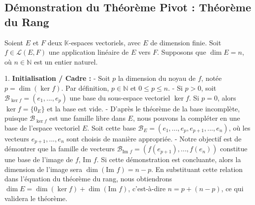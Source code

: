 \documentclass{report}
\begin{document}
\subsection*{Démonstration du Théorème Pivot : Théorème du Rang}
Soient $E$ et $F$ deux $\mathbb{K}$-espaces vectoriels, avec $E$ de dimension finie. Soit $f \in \mathcal{L}(E, F)$ une application linéaire de $E$ vers $F$. Supposons que $\dim E = n$, où $n \in \mathbb{N}$ est un entier naturel.

1.  \textbf{Initialisation / Cadre :}
    -   Soit $p$ la dimension du noyau de $f$, notée $p = \dim(\ker f)$. Par définition, $p \in \mathbb{N}$ et $0 \le p \le n$.
    -   Si $p > 0$, soit $\mathcal{B}_{\ker f} = (e_1, ..., e_p)$ une base du sous-espace vectoriel $\ker f$. Si $p=0$, alors $\ker f = \{0_E\}$ et la base est vide.
    -   D'après le théorème de la base incomplète, puisque $\mathcal{B}_{\ker f}$ est une famille libre dans $E$, nous pouvons la compléter en une base de l'espace vectoriel $E$. Soit cette base $\mathcal{B}_E = (e_1, ..., e_p, e_{p+1}, ..., e_n)$, où les vecteurs $e_{p+1}, ..., e_n$ sont choisis de manière appropriée.
    -   Notre objectif est de démontrer que la famille de vecteurs $\mathcal{B}_{\text{Im } f} = (f(e_{p+1}), ..., f(e_n))$ constitue une base de l'image de $f$, $\text{Im } f$. Si cette démonstration est concluante, alors la dimension de l'image sera $\dim(\text{Im } f) = n - p$. En substituant cette relation dans l'équation du théorème du rang, nous obtiendrons $\dim E = \dim(\ker f) + \dim(\text{Im } f)$, c'est-à-dire $n = p + (n-p)$, ce qui validera le théorème.
\end{document}
